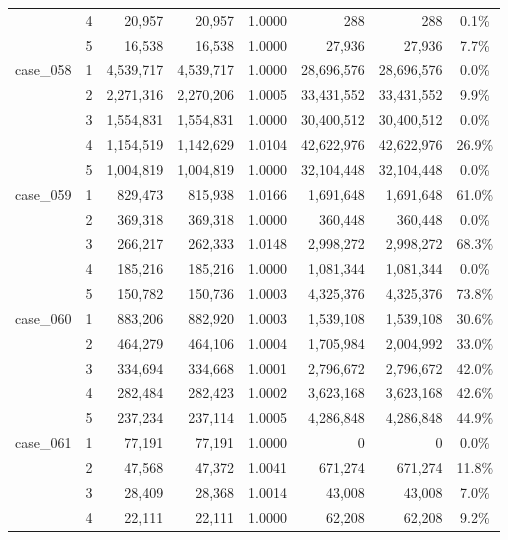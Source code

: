 \begin{footnotesize}
\begin{longtable}{l c rr c rr c}
 & 4 & 20{,}957 & 20{,}957 & 1.0000 & 288 & 288 & 0.1\% \\
 & 5 & 16{,}538 & 16{,}538 & 1.0000 & 27{,}936 & 27{,}936 & 7.7\% \\
\addlinespace[2pt]
case\_058 & 1 & 4{,}539{,}717 & 4{,}539{,}717 & 1.0000 & 28{,}696{,}576 & 28{,}696{,}576 & 0.0\% \\
 & 2 & 2{,}271{,}316 & 2{,}270{,}206 & 1.0005 & 33{,}431{,}552 & 33{,}431{,}552 & 9.9\% \\
 & 3 & 1{,}554{,}831 & 1{,}554{,}831 & 1.0000 & 30{,}400{,}512 & 30{,}400{,}512 & 0.0\% \\
 & 4 & 1{,}154{,}519 & 1{,}142{,}629 & 1.0104 & 42{,}622{,}976 & 42{,}622{,}976 & 26.9\% \\
 & 5 & 1{,}004{,}819 & 1{,}004{,}819 & 1.0000 & 32{,}104{,}448 & 32{,}104{,}448 & 0.0\% \\
\addlinespace[2pt]
case\_059 & 1 & 829{,}473 & 815{,}938 & 1.0166 & 1{,}691{,}648 & 1{,}691{,}648 & 61.0\% \\
 & 2 & 369{,}318 & 369{,}318 & 1.0000 & 360{,}448 & 360{,}448 & 0.0\% \\
 & 3 & 266{,}217 & 262{,}333 & 1.0148 & 2{,}998{,}272 & 2{,}998{,}272 & 68.3\% \\
 & 4 & 185{,}216 & 185{,}216 & 1.0000 & 1{,}081{,}344 & 1{,}081{,}344 & 0.0\% \\
 & 5 & 150{,}782 & 150{,}736 & 1.0003 & 4{,}325{,}376 & 4{,}325{,}376 & 73.8\% \\
\addlinespace[2pt]
case\_060 & 1 & 883{,}206 & 882{,}920 & 1.0003 & 1{,}539{,}108 & 1{,}539{,}108 & 30.6\% \\
 & 2 & 464{,}279 & 464{,}106 & 1.0004 & 1{,}705{,}984 & 2{,}004{,}992 & 33.0\% \\
 & 3 & 334{,}694 & 334{,}668 & 1.0001 & 2{,}796{,}672 & 2{,}796{,}672 & 42.0\% \\
 & 4 & 282{,}484 & 282{,}423 & 1.0002 & 3{,}623{,}168 & 3{,}623{,}168 & 42.6\% \\
 & 5 & 237{,}234 & 237{,}114 & 1.0005 & 4{,}286{,}848 & 4{,}286{,}848 & 44.9\% \\
\addlinespace[2pt]
case\_061 & 1 & 77{,}191 & 77{,}191 & 1.0000 & 0 & 0 & 0.0\% \\
 & 2 & 47{,}568 & 47{,}372 & 1.0041 & 671{,}274 & 671{,}274 & 11.8\% \\
 & 3 & 28{,}409 & 28{,}368 & 1.0014 & 43{,}008 & 43{,}008 & 7.0\% \\
 & 4 & 22{,}111 & 22{,}111 & 1.0000 & 62{,}208 & 62{,}208 & 9.2\% \\

\end{longtable}
\end{footnotesize}
